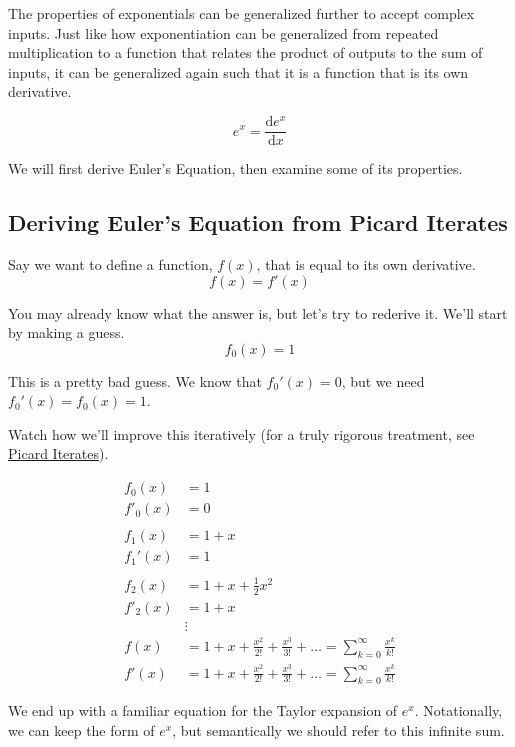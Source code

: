 \documentclass[
  letterpaper,
  DIV=11,
  numbers=noendperiod]{scrartcl}
\begin{document}
The properties of exponentials can be generalized further to accept
complex inputs. Just like how exponentiation can be generalized from
repeated multiplication to a function that relates the product of
outputs to the sum of inputs, it can be generalized again such that it
is a function that is its own derivative.

\[
e^x = \frac{\text{d}e^x}{\text{d}x}
\]

We will first derive Euler's Equation, then examine some of its
properties.

\subsection{Deriving Euler's Equation from Picard
Iterates}\label{deriving-eulers-equation-from-picard-iterates}

Say we want to define a function, \(f(x)\), that is equal to its own
derivative. \[f(x) = f'(x)\]

You may already know what the answer is, but let's try to rederive it.
We'll start by making a guess. \[f_0(x) = 1\]

This is a pretty bad guess. We know that \(f_0'(x) = 0\), but we need
\(f_0'(x) = f_0(x) = 1\).

Watch how we'll improve this iteratively (for a truly rigorous
treatment, see
\href{https://en.wikipedia.org/wiki/Picard–Lindelöf_theorem}{Picard
Iterates}).

\begin{align}
f_0(x) &= 1 \\
f'_0(x) &= 0\\
\\
f_1(x) &= 1+x \\
f_1'(x) &= 1\\
\\
f_2(x) &= 1 + x + \frac{1}{2}x^2 \\
f'_2(x) &= 1 + x\\

&\vdots \\

f(x) &= 1 + x + \frac{x^2}{2!} + \frac{x^3}{3!} + \dots = \sum_{k=0}^\infty \frac{x^k}{k!}\\
f'(x) &= 1 + x + \frac{x^2}{2!} + \frac{x^3}{3!} + \dots = \sum_{k=0}^\infty \frac{x^k}{k!}
\end{align}

We end up with a familiar equation for the Taylor expansion of \(e^x\).
Notationally, we can keep the form of \(e^x\), but semantically we
should refer to this infinite sum.
\end{document}
